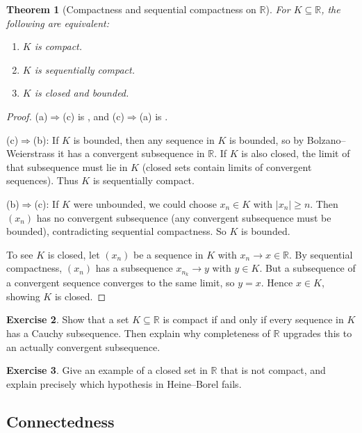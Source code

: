 \documentclass[12pt]{article}
\numberwithin{equation}{section}
\def\abs#1{|#1|}
\newcommand{\RR}{\mathbb{R}}
\DeclarePairedDelimiter{\abs}{\lvert}{\rvert}
\theoremstyle{plain}
\newtheorem{theorem}{Theorem}[section]
\theoremstyle{definition}
\newtheorem{exercise}[theorem]{Exercise}
\theoremstyle{remark}
\begin{document}
\begin{theorem}[Compactness and sequential compactness on $\RR$]\label{thm:compact-seqcompact}
For $K\subseteq\RR$, the following are equivalent:
\begin{enumerate}[label=(\alph*)]
\item $K$ is compact.
\item $K$ is sequentially compact.
\item $K$ is closed and bounded.
\end{enumerate}
\end{theorem}

\begin{proof}
(a)$\Rightarrow$(c) is , and (c)$\Rightarrow$(a) is .

(c)$\Rightarrow$(b): If $K$ is bounded, then any sequence in $K$ is bounded, so by Bolzano--Weierstrass it has a convergent subsequence in $\RR$.
If $K$ is also closed, the limit of that subsequence must lie in $K$ (closed sets contain limits of convergent sequences). Thus $K$ is sequentially compact.

(b)$\Rightarrow$(c): If $K$ were unbounded, we could choose $x_n\in K$ with $\abs{x_n}\ge n$.
Then $(x_n)$ has no convergent subsequence (any convergent subsequence must be bounded), contradicting sequential compactness.
So $K$ is bounded.

To see $K$ is closed, let $(x_n)$ be a sequence in $K$ with $x_n\to x\in\RR$.
By sequential compactness, $(x_n)$ has a subsequence $x_{n_k}\to y$ with $y\in K$.
But a subsequence of a convergent sequence converges to the same limit, so $y=x$.
Hence $x\in K$, showing $K$ is closed.
\end{proof}

\begin{exercise}
Show that a set $K\subseteq\RR$ is compact if and only if every sequence in $K$ has a Cauchy subsequence.
Then explain why completeness of $\RR$ upgrades this to an actually convergent subsequence.
\end{exercise}

\begin{exercise}
Give an example of a closed set in $\RR$ that is not compact, and explain precisely which hypothesis in Heine--Borel fails.
\end{exercise}

\newpage

\subsection{Connectedness}
\end{document}
